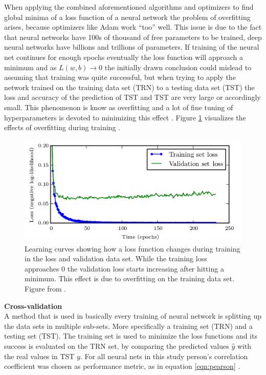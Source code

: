 When applying the combined aforementioned algorithms and optimizers to find global minima of a loss function
of a neural network the problem of overfitting arises, because optimizers like Adam work ``too'' well. This
issue is due to the fact that neural networks have 100s of thousand of free parameters to be trained, deep
neural networks have billions and trillions of parameters. If training of the neural net continues for enough
epochs eventually the loss function will approach a minimum and as $ L(w,b)\rightarrow 0 $ the initially drawn
conclusion could mislead to assuming that training was quite successful, but when trying to apply the network trained on
the training data set (TRN) to a testing data set (TST) the loss and accuracy of the prediction of TST and
TST are very large or accordingly small. This phenomenon is know as overfitting and a lot of fine tuning of
hyperparameters is devoted to minimizing this effect \cite{tetko1995neural}. Figure \ref{fig:overfitting}
visualizes the effects of overfitting during training \cite{goodfellow2016deep}.

\begin{figure}[H]
  \centering \includegraphics[height=.35\textheight, width=1.1\textwidth]{Figures/overfitting} \decoRule
  \caption[Training vs. validation loss over time]{Learning curves showing how a loss function changes during training
   in the loss and validation data set. While the training loss approaches 0 the validation loss starts increasing
   after hitting a minimum. This effect is due to overfitting on the training data set. Figure from
   \cite{goodfellow2016deep}.}
 \label{fig:overfitting}
\end{figure}

\textbf{Cross-validation} \\

A method that is used in basically every training of neural network is splitting up the data sets in multiple
sub-sets. More specifically a training set (TRN) and a testing set (TST). The training set is used to
minimize the loss functions and its success is evaluated on the TRN set, by comparing the predicted values
$\hat{y}$ with the real values in TST $y$. For all neural nets in this study person's correlation coefficient
was chosen as performance metric, as in equation \ref{eqn:pearson} \cite{soper1917distribution}.

